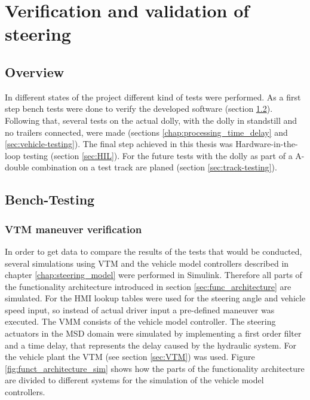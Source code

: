 \documentclass[ExampleMasters.tex]{subfiles}
\begin{document}
\clearpage
{\pagestyle{empty}\cleardoublepage}%
\chapter{Verification and validation of steering}
\label{chap:testing}

\section{Overview}
In different states of the project different kind of tests were performed. As a first step bench tests were done to verify the developed software (section \ref{sec:bench-testing}). Following that, several tests on the actual dolly, with the dolly in standstill and no trailers connected, were made (sections \ref{chap:processing_time_delay} and \ref{sec:vehicle-testing}). The final step achieved in this thesis was Hardware-in-the-loop testing (section \ref{sec:HIL}).
For the future tests with the dolly as part of a A-double combination on a test track are planed (section \ref{sec:track-testing}).

\section{Bench-Testing}
\label{sec:bench-testing}
\subsection{VTM maneuver verification}

In order to get data to compare the results of the tests that would be conducted, several simulations using \gls{VTM} and the vehicle model controllers described in chapter \ref{chap:steering_model} were performed in Simulink. Therefore all parts of the functionality architecture introduced in section \ref{sec:func_architecture} are simulated.
For the \gls{HMI} lookup tables were used for the steering angle and vehicle speed input, so instead of actual driver input a pre-defined maneuver was executed. The \gls{VMM} consists of the vehicle model controller. The steering actuators in the \gls{MSD} domain were simulated by implementing a first order filter and a time delay, that represents the delay caused by the hydraulic system. For the vehicle plant the \gls{VTM} (see section \ref{sec:VTM}) was used. Figure \ref{fig:funct_architecture_sim} shows how the parts of the functionality architecture are divided to different systems for the simulation of the vehicle model controllers.
\end{document}
